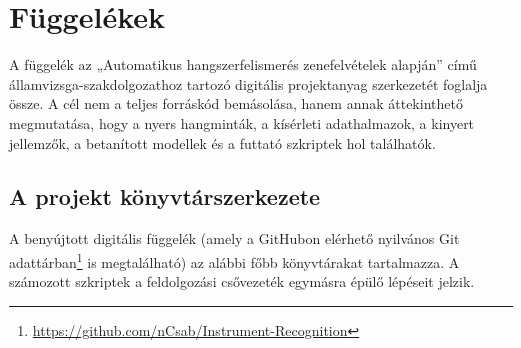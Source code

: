 \appendix

\chapter{Függelékek}
\label{chap:fuggelek}

A függelék az „Automatikus hangszerfelismerés zenefelvételek alapján” című
államvizsga-szakdolgozathoz tartozó digitális projektanyag szerkezetét foglalja
össze. A cél nem a teljes forráskód bemásolása, hanem annak áttekinthető
megmutatása, hogy a nyers hangminták, a kísérleti adathalmazok, a kinyert
jellemzők, a betanított modellek és a futtató szkriptek hol találhatók.

\section{A projekt könyvtárszerkezete}
\label{sec:konyvtarszerkezet}

A benyújtott digitális függelék (amely a GitHubon elérhető nyilvános Git
adattárban\footnote{\url{https://github.com/nCsab/Instrument-Recognition}} is
megtalálható) az alábbi főbb könyvtárakat tartalmazza. A számozott szkriptek a
feldolgozási csővezeték egymásra épülő lépéseit jelzik.

